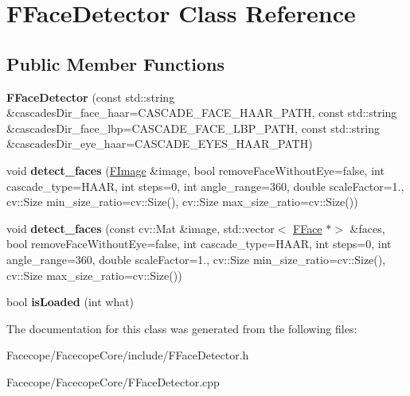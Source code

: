 \hypertarget{classFFaceDetector}{}\section{F\+Face\+Detector Class Reference}
\label{classFFaceDetector}
\subsection*{Public Member Functions}
\begin{DoxyCompactItemize}
\item 
\mbox{\label{classFFaceDetector_a85d71ee3f97ea60bcd7adc94d68d30e6}} 
{\bfseries F\+Face\+Detector} (const std\+::string \&cascades\+Dir\+\_\+face\+\_\+haar=C\+A\+S\+C\+A\+D\+E\+\_\+\+F\+A\+C\+E\+\_\+\+H\+A\+A\+R\+\_\+\+P\+A\+TH, const std\+::string \&cascades\+Dir\+\_\+face\+\_\+lbp=C\+A\+S\+C\+A\+D\+E\+\_\+\+F\+A\+C\+E\+\_\+\+L\+B\+P\+\_\+\+P\+A\+TH, const std\+::string \&cascades\+Dir\+\_\+eye\+\_\+haar=C\+A\+S\+C\+A\+D\+E\+\_\+\+E\+Y\+E\+S\+\_\+\+H\+A\+A\+R\+\_\+\+P\+A\+TH)
\item 
\mbox{\label{classFFaceDetector_a734d9d1224a97db0db4556e2804bb04c}} 
void {\bfseries detect\+\_\+faces} (\hyperlink{classFImage}{F\+Image} \&image, bool remove\+Face\+Without\+Eye=false, int cascade\+\_\+type=H\+A\+AR, int steps=0, int angle\+\_\+range=360, double scale\+Factor=1., cv\+::\+Size min\+\_\+size\+\_\+ratio=cv\+::\+Size(), cv\+::\+Size max\+\_\+size\+\_\+ratio=cv\+::\+Size())
\item 
\mbox{\label{classFFaceDetector_a6bf029be40508d735d440f193083d2a9}} 
void {\bfseries detect\+\_\+faces} (const cv\+::\+Mat \&image, std\+::vector$<$ \hyperlink{classFFace}{F\+Face} $\ast$$>$ \&faces, bool remove\+Face\+Without\+Eye=false, int cascade\+\_\+type=H\+A\+AR, int steps=0, int angle\+\_\+range=360, double scale\+Factor=1., cv\+::\+Size min\+\_\+size\+\_\+ratio=cv\+::\+Size(), cv\+::\+Size max\+\_\+size\+\_\+ratio=cv\+::\+Size())
\item 
\mbox{\label{classFFaceDetector_a1799777797a5153b50b40615ae58e953}} 
bool {\bfseries is\+Loaded} (int what)
\end{DoxyCompactItemize}


The documentation for this class was generated from the following files\+:\begin{DoxyCompactItemize}
\item 
Facecope/\+Facecope\+Core/include/F\+Face\+Detector.\+h\item 
Facecope/\+Facecope\+Core/F\+Face\+Detector.\+cpp\end{DoxyCompactItemize}
